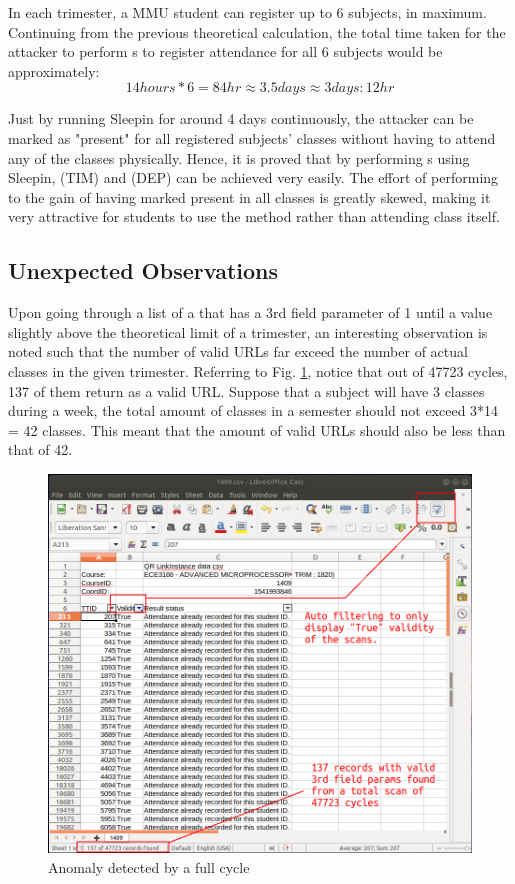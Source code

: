 \documentclass[runningheads]{llncs}
\begin{document}
In each trimester, a MMU student can register up to 6 subjects, in maximum. Continuing from the previous theoretical calculation, the total time taken for the attacker to perform \scanattack{}s to register attendance for all 6 subjects would be approximately:
\begin{equation}14 hours * 6 = 84 hr  \approx  3.5 days  \approx  3 days : 12 hr\end{equation}

Just by running Sleepin for around 4 days continuously, the attacker can be marked as "present" for all registered subjects' classes without having to attend any of the classes physically. Hence, it is proved that by performing \scanattack{}s using Sleepin, (TIM) and (DEP) can be achieved very easily. The effort of performing \scanattack{} to the gain of having marked present in all classes is greatly skewed, making it very attractive for students to use the method rather than attending class itself. 

\subsection{Unexpected Observations}
Upon going through a list of a \scanattack{} that has a 3rd field parameter of 1 until a value slightly above the theoretical limit of a trimester, an interesting observation is noted such that the number of valid URLs far exceed the number of actual classes in the given trimester. Referring to Fig. \ref{fig:sleepin_obs}, notice that out of 47723 cycles, 137 of them return as a valid URL. Suppose that a subject will have 3 classes during a week, the total amount of classes in a semester should not exceed 3*14 = 42 classes. This meant that the amount of valid URLs should also be less than that of 42.

\begin{figure}
\includegraphics[width=\textwidth]{imgres/sleepin_observation.png}
\caption{Anomaly detected by a full cycle \scanattack{}} 
\label{fig:sleepin_obs}
\end{figure}
\end{document}
